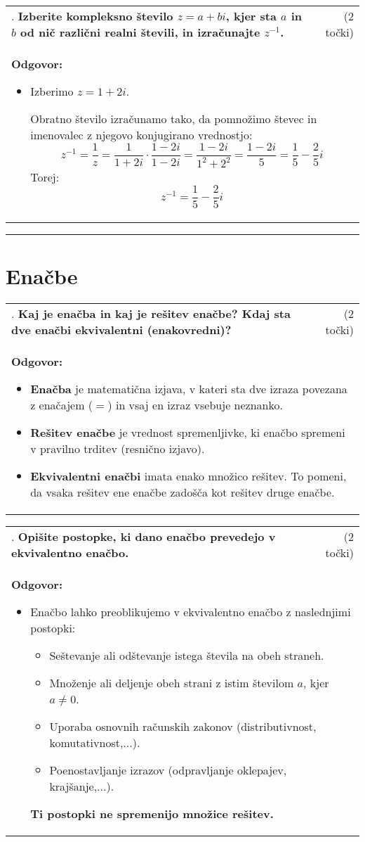 \documentclass[12pt]{article}
\newcounter{vprasanje}[section]
\renewcommand{\thevprasanje}{\roman{vprasanje}}
\newcommand{\vprasanje}[2]{%
  \stepcounter{vprasanje}%
  \textbf{\thevprasanje}. \textbf{#1} & (#2) \\
}
\newcommand{\odgovor}[1]{%
  \multicolumn{2}{p{\dimexpr\textwidth-2\tabcolsep\relax}}{%
    \small \textbf{Odgovor:} #1%
  } \\[1em]%
}
\newcommand{\crta}{\rule{\textwidth}{0.4pt}}
\newcommand{\naslov}[1]{%
  \vspace{1em} 
  \section{#1}
  \addcontentsline{toc}{section}{\protect\numberline{}#1}%
}
\newcommand{\razmak}[1]{%
  \vspace{#1}
}
\begin{document}
\begin{tabularx}{\textwidth}{X r}
\vprasanje{Izberite kompleksno število $z=a+b i$, kjer sta $a$ in $b$ od nič različni realni števili, in izračunajte $z^{-1}$.}{2 točki}
\odgovor{%
\begin{itemize}
\item Izberimo $z = 1 + 2i$.

Obratno število izračunamo tako, da pomnožimo števec in imenovalec z njegovo konjugirano vrednostjo:
\[
z^{-1} = \frac{1}{z} = \frac{1}{1 + 2i} \cdot \frac{1 - 2i}{1 - 2i} = \frac{1 - 2i}{1^2 + 2^2} = \frac{1 - 2i}{5} = \frac{1}{5} - \frac{2}{5}i
\]
Torej:
\[
z^{-1} = \frac{1}{5} - \frac{2}{5}i
\]
\end{itemize}
}
\end{tabularx}

\razmak{0.5em}


\crta

\naslov{Enačbe}

\begin{tabularx}{\textwidth}{X r}
\vprasanje{Kaj je enačba in kaj je rešitev enačbe? Kdaj sta dve enačbi ekvivalentni (enakovredni)?}{2 točki}
\odgovor{%
\begin{itemize}
	\item \textbf{Enačba} je matematična izjava, v kateri sta dve izraza povezana z enačajem ($=$) in vsaj en izraz vsebuje neznanko.

	\item \textbf{Rešitev enačbe} je vrednost spremenljivke, ki enačbo spremeni v pravilno trditev (resnično izjavo).

	\item \textbf{Ekvivalentni enačbi} imata enako množico rešitev. To pomeni, da vsaka rešitev ene enačbe zadošča kot rešitev druge enačbe.
\end{itemize}
}
\end{tabularx}

\begin{tabularx}{\textwidth}{X r}
\vprasanje{Opišite postopke, ki dano enačbo prevedejo v ekvivalentno enačbo.}{2 točki}
\odgovor{%
\begin{itemize}
	\item Enačbo lahko preoblikujemo v ekvivalentno enačbo z naslednjimi postopki:
	\begin{itemize}
	  \item Seštevanje ali odštevanje istega števila na obeh straneh.
	  \item Množenje ali deljenje obeh strani z istim številom $a$, kjer $a \neq 0$. 
	  \item Uporaba osnovnih računskih zakonov (distributivnost, komutativnost,...).
	  \item Poenostavljanje izrazov (odpravljanje oklepajev, krajšanje,...).
	\end{itemize}
\textbf{Ti postopki ne spremenijo množice rešitev.}
\end{itemize}
}
\end{tabularx}
\end{document}
